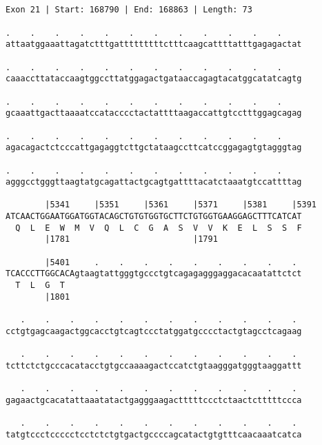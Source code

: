 \documentclass{article}
\begin{document}
\begin{Verbatim}
                                                       
 
Exon 21 | Start: 168790 | End: 168863 | Length: 73
 
.    .    .    .    .    .    .    .    .    .    .    .    
attaatggaaattagatctttgatttttttttctttcaagcattttatttgagagactat
                                                            
.    .    .    .    .    .    .    .    .    .    .    .    
caaaccttataccaagtggccttatggagactgataaccagagtacatggcatatcagtg
                                                            
.    .    .    .    .    .    .    .    .    .    .    .    
gcaaattgacttaaaatccatacccctactattttaagaccattgtcctttggagcagag
                                                            
.    .    .    .    .    .    .    .    .    .    .    .    
agacagactctcccattgagaggtcttgctataagccttcatccggagagtgtagggtag
                                                            
.    .    .    .    .    .    .    .    .    .    .    .    
agggcctgggttaagtatgcagattactgcagtgattttacatctaaatgtccattttag
                                                            
        |5341     |5351     |5361     |5371     |5381     |5391
ATCAACTGGAATGGATGGTACAGCTGTGTGGTGCTTCTGTGGTGAAGGAGCTTTCATCAT
  Q  L  E  W  M  V  Q  L  C  G  A  S  V  V  K  E  L  S  S  F
        |1781                         |1791                 
  
        |5401     .    .    .    .    .    .    .    .    . 
TCACCCTTGGCACAgtaagtattgggtgccctgtcagagagggaggacacaatattctct
  T  L  G  T                                                
        |1801                                               
  
   .    .    .    .    .    .    .    .    .    .    .    . 
cctgtgagcaagactggcacctgtcagtccctatggatgcccctactgtagcctcagaag
                                                            
   .    .    .    .    .    .    .    .    .    .    .    . 
tcttctctgcccacatacctgtgccaaaagactccatctgtaagggatgggtaaggattt
                                                            
   .    .    .    .    .    .    .    .    .    .    .    . 
gagaactgcacatattaaatatactgagggaagactttttccctctaactctttttccca
                                                            
   .    .    .    .    .    .    .    .    .    .    .    . 
tatgtccctccccctcctctctgtgactgccccagcatactgtgtttcaacaaatcatca
                                                            

\end{Verbatim}
\end{document}
